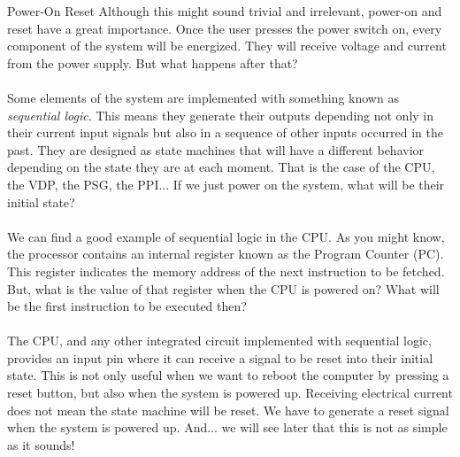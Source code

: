 \begin{theory}{Power-On Reset}
  Although this might sound trivial and irrelevant, power-on and reset have a great importance. Once the user presses the power switch on, every component of the system will be energized. They will receive voltage and current from the power supply. But what happens after that?\\\\

  Some elements of the system are implemented with something known as {\it sequential logic}. This means they generate their outputs depending not only in their current input signals but also in a sequence of other inputs occurred in the past. They are designed as state machines that will have a different behavior depending on the state they are at each moment. That is the case of the CPU, the VDP, the PSG, the PPI... If we just power on the system, what will be their initial state?\\\\

  We can find a good example of sequential logic in the CPU. As you might know, the processor contains an internal register known as the Program Counter (PC). This register indicates the memory address of the next instruction to be fetched. But, what is the value of that register when the CPU is powered on? What will be the first instruction to be executed then?\\\\

  The CPU, and any other integrated circuit implemented with sequential logic, provides an input pin where it can receive a signal to be reset into their initial state. This is not only useful when we want to reboot the computer by pressing a reset button, but also when the system is powered up. Receiving electrical current does not mean the state machine will be reset. We have to generate a reset signal when the system is powered up. And... we will see later that this is not as simple as it sounds!
\end{theory}



